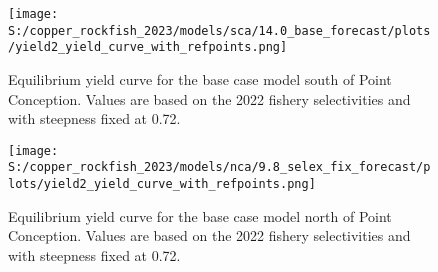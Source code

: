 \documentclass[11pt,
  english,
  letterpaper,
]{article}
\begin{document}
\pagebreak

\begin{figure}
\centering
\texttt{[image: S:/copper\_rockfish\_2023/models/sca/14.0\_base\_forecast/plots/yield2\_yield\_curve\_with\_refpoints.png]}
\caption{Equilibrium yield curve for the base case model south of Point Conception. Values are based on the 2022 fishery selectivities and with steepness fixed at 0.72.\label{fig:yield-south}}
\end{figure}

\pagebreak

\begin{figure}
\centering
\texttt{[image: S:/copper\_rockfish\_2023/models/nca/9.8\_selex\_fix\_forecast/plots/yield2\_yield\_curve\_with\_refpoints.png]}
\caption{Equilibrium yield curve for the base case model north of Point Conception. Values are based on the 2022 fishery selectivities and with steepness fixed at 0.72.\label{fig:yield-north}}
\end{figure}

\pagebreak
\end{document}
